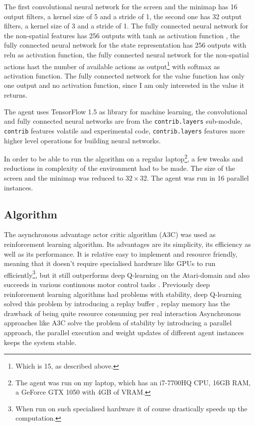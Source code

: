 \documentclass{article}
\begin{document}
The first convolutional neural network for the screen and the minimap has 16 
output filters, a kernel size of 5 and a stride of 1, the second one has 32 
output filters, a kernel size of 3 and a stride of 1. The fully connected 
neural network for the non-spatial features has 256 outputs with tanh as 
activation function	, the fully connected neural network for the state 
representation has 256 outputs with relu as activation function, the fully 
connected neural network for the non-spatial actions hast the number of 
available actions as output\footnote{Which is 15, as described above.} with 
softmax as activation function. The fully connected network for the value 
function has only one output and no activation function, since I am only 
interested in the value it returns.

The agent uses TensorFlow 1.5 as library for machine learning, the 
convolutional and fully connected neural networks are from the 
\texttt{contrib.layers} sub-module, \texttt{contrib} features volatile and 
experimental code, \texttt{contrib.layers} features more higher level 
operations for building neural networks.

In order to be able to run the algorithm on a regular laptop\footnote{The agent 
was run on my laptop, which has an i7-7700HQ CPU, 16GB RAM, a GeForce GTX 1050 
with 4GB of VRAM.}, a few tweaks and reductions in complexity of the 
environment had to be made. The size of the screen and the minimap was reduced 
to $32 \times 32$. The agent was run in 16 parallel instances.

\subsection{Algorithm}
\label{algorithm}
The asynchronous advantage actor critic algorithm (A3C) \cite{Mnih2016} was 
used as reinforcement learning algorithm. Its advantages are its simplicity, 
its efficiency as well as its performance. It is relative easy to implement and 
resource friendly, meaning that it doesn't require specialised hardware like 
GPUs to run efficiently\footnote{When run on such specialised hardware it of 
course drastically speeds up the computation.}, but it still outperforms deep 
Q-learning on the Atari-domain and also succeeds in various continuous motor 
control tasks \cite{Mnih2016}. Previously deep reinforcement learning algorithms
had problems with stability, deep Q-learning solved this problem by introducing 
a replay buffer \cite{Mnih2013}, replay memory has the drawback of being quite 
resource consuming per real interaction Asynchronous approaches like A3C solve 
the problem of stability by introducing a parallel approach, the parallel 
execution and weight updates of different agent instances keeps the system 
stable.
\end{document}
